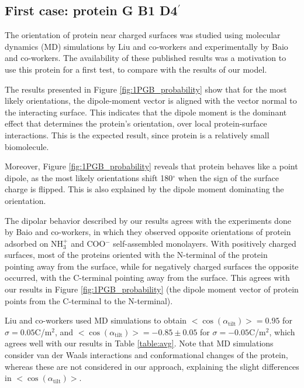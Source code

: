 
\subsection{First case: protein G B1 D4$^\prime$} \label{sec:disc_1PGB}

The orientation of protein \gb near charged surfaces was studied using molecular dynamics (MD) simulations by Liu and co-workers\cite{LiuLiaoZhou2013} and  experimentally by Baio and co-workers.\cite{BaioWeidnerBaughGambleStaytonCastner2012} The availability of these published results was a motivation to use this protein for a first test, to compare with the results of our model. 

The results presented in Figure \ref{fig:1PGB_probability} show that for the most likely orientations, the dipole-moment vector is aligned with the vector normal to the interacting surface. This indicates that the dipole moment is the dominant effect that determines the protein's orientation, over local protein-surface  interactions. This is the expected result, since protein \gb is a relatively small biomolecule. 

Moreover, Figure \ref{fig:1PGB_probability} reveals that protein \gb behaves like a point dipole, as the most likely orientations shift 180$^\circ$ when the sign of the surface charge is flipped. This is also explained by the dipole moment dominating the orientation.

The dipolar behavior described by our results agrees with the experiments done by Baio and co-workers, \cite{BaioWeidnerBaughGambleStaytonCastner2012} in which they observed opposite orientations of protein \gb adsorbed on NH$_3^+$ and COO$^-$ self-assembled monolayers. With positively charged surfaces, most of the proteins oriented with the N-terminal of the protein pointing away from the surface, while for negatively charged surfaces the opposite occurred, with the C-terminal pointing away from the surface. This agrees with our results in Figure \ref{fig:1PGB_probability} (the dipole moment vector of protein \gb points from the C-terminal to the N-terminal).

Liu and co-workers \cite{LiuLiaoZhou2013} used MD simulations to obtain $<\cos(\alpha_{\text{tilt}})>=0.95$ for $\sigma = 0.05$C/m$^2$, and $<\cos(\alpha_{\text{tilt}})>=-0.85\pm0.05$ for $\sigma = -0.05$C/m$^2$, which agrees well with our results in Table \ref{table:avg}. Note that MD simulations consider van der Waals interactions and conformational changes of the protein, whereas these are not considered in our approach, explaining the slight differences in $<\cos(\alpha_{\text{tilt}})>$.


